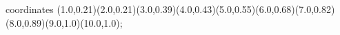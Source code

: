 					coordinates { (1.0,0.21)(2.0,0.21)(3.0,0.39)(4.0,0.43)(5.0,0.55)(6.0,0.68)(7.0,0.82)(8.0,0.89)(9.0,1.0)(10.0,1.0)};